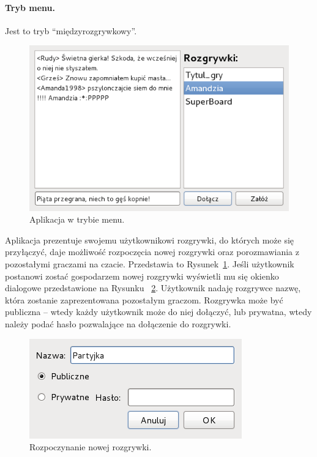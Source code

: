 \documentclass[a4paper, 12pt]{article}
\begin{document}
\paragraph{Tryb menu.} Jest to tryb ``międzyrozgrywkowy''.

\begin{figure}
\centering
\includegraphics[scale=0.8]{rysunki/menu.png}
\caption{Aplikacja w trybie menu.}
\label{fig:menu}
\end{figure}

Aplikacja prezentuje swojemu użytkownikowi rozgrywki, do których może się przyłączyć, daje możliwość rozpoczęcia nowej rozgrywki oraz porozmawiania z pozostałymi graczami na czacie. Przedstawia to Rysunek~\ref{fig:menu}. Jeśli użytkownik postanowi zostać gospodarzem nowej rozgrywki wyświetli mu się okienko dialogowe przedstawione na Rysunku~ \ref{fig:nowagra}. Użytkownik nadaję rozgrywce nazwę, która zostanie zaprezentowana pozostałym graczom. Rozgrywka może być publiczna -- wtedy każdy użytkownik może do niej dołączyć, lub prywatna, wtedy należy podać hasło pozwalające na dołączenie do rozgrywki. 

\begin{figure}
\centering
\includegraphics[scale=0.8]{rysunki/nowagra.png}
\caption{Rozpoczynanie nowej rozgrywki.}
\label{fig:nowagra}
\end{figure}
\end{document}
